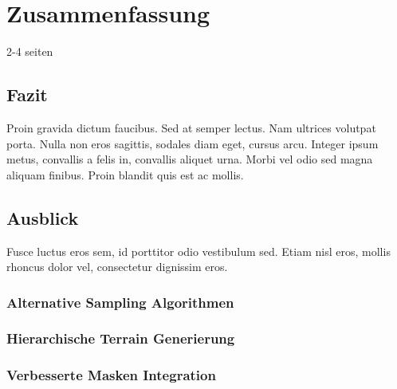 \chapter{Zusammenfassung}
2-4 seiten

\section{Fazit}

Proin gravida dictum faucibus. Sed at semper lectus. Nam ultrices volutpat porta. Nulla non eros sagittis, sodales diam eget, cursus arcu. Integer ipsum metus, convallis a felis in, convallis aliquet urna. Morbi vel odio sed magna aliquam finibus. Proin blandit quis est ac mollis.\cite{join_study}

\section{Ausblick}

Fusce luctus eros sem, id porttitor odio vestibulum sed. Etiam nisl eros, mollis rhoncus dolor vel, consectetur dignissim eros. 

\subsection{Alternative Sampling Algorithmen}

\subsection{Hierarchische Terrain Generierung}



\subsection{Verbesserte Masken Integration}

